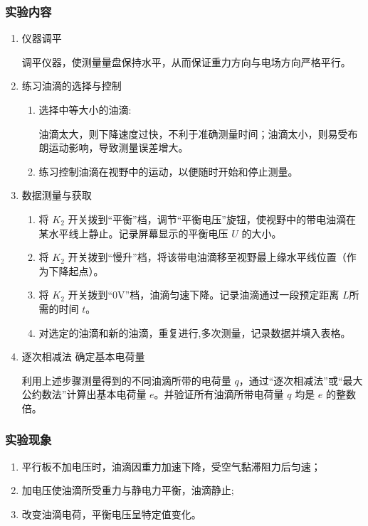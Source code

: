 \documentclass[yuxi]{../../templates/Report}%
\begin{document}
\subsubsection{实验内容}

\begin{enumerate}
    \item 仪器调平

    调平仪器，使测量量盘保持水平，从而保证重力方向与电场方向严格平行。

    \item 练习油滴的选择与控制

    \begin{enumerate}
        \item 选择中等大小的油滴:

        油滴太大，则下降速度过快，不利于准确测量时间；油滴太小，则易受布朗运动影响，导致测量误差增大。

        \item 练习控制油滴在视野中的运动，以便随时开始和停止测量。
    \end{enumerate}

    \item 数据测量与获取

    \begin{enumerate}
        \item 将 $K_2$ 开关拨到“平衡”档，调节“平衡电压”旋钮，使视野中的带电油滴在某水平线上静止。记录屏幕显示的平衡电压 $U$ 的大小。

        \item 将 $K_2$ 开关拨到“慢升”档，将该带电油滴移至视野最上缘水平线位置（作为下降起点）。

        \item 将 $K_2$ 开关拨到“0V”档，油滴匀速下降。记录油滴通过一段预定距离 $L$所需的时间 $t$。

        \item 对选定的油滴和新的油滴，重复进行,多次测量，记录数据并填入表格。
    \end{enumerate}

    \item 逐次相减法 确定基本电荷量

    利用上述步骤测量得到的不同油滴所带的电荷量 $q$，通过“逐次相减法”或“最大公约数法”计算出基本电荷量 $e$。并验证所有油滴所带电荷量 $q$ 均是 $e$ 的整数倍。

\end{enumerate}
\subsubsection{实验现象}
\begin{enumerate}
    \item 平行板不加电压时，油滴因重力加速下降，受空气黏滞阻力后匀速；
    \item 加电压使油滴所受重力与静电力平衡，油滴静止;
    \item 改变油滴电荷，平衡电压呈特定值变化。
\end{enumerate}
\end{document}
